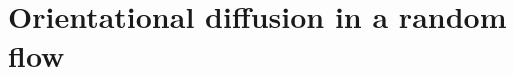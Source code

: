 \documentclass[thesis.tex]{subfiles}
\begin{document}





\section{Orientational diffusion in a random flow}
\end{document}
